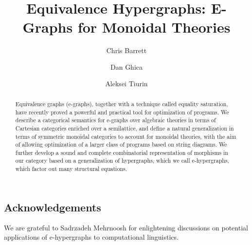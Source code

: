 \documentclass
  [ acmsmall
  , pdftex
  , dvipsnames
  , review
  , nonacm
  , screen
  ]{acmart}
\title{Equivalence Hypergraphs: E-Graphs for Monoidal Theories }
\author{Chris Barrett}
\author{Dan Ghica}
\author{Aleksei Tiurin}
\begin{document}
\begin{abstract}
Equivalence graphs (e-graphs), together with a technique called equality saturation, have recently proved a powerful and practical tool for optimization of programs.  We describe a categorical semantics for e-graphs over algebraic theories in terms of Cartesian categories enriched over a semilattice,  and define a natural generalization in terms of symmetric monoidal categories to account for monoidal theories,  with the aim of allowing optimization of a larger class of programs based on string diagrams.  We further develop a sound and complete combinatorial representation of morphisms in our category based on a generalization of hypergraphs,  which we call e-hypergraphs,  which factor out many structural equations. 
\end{abstract}

\maketitle









\subsection*{Acknowledgements}
We are grateful to Sadrzadeh Mehrnoosh for enlightening discussions on potential applications of e-hypergraphs to computational linguistics. 



\end{document}
